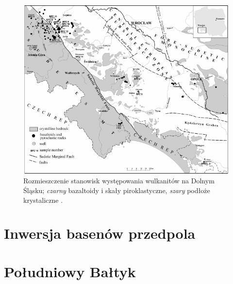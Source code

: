 \documentclass[11.5pt,twoside]{report}
\begin{document}
 \begin{figure}[h]
 	\centering
 	\includegraphics[width=0.7\linewidth]{../Termika/dslwulkanity}
 	\caption{Rozmieszczenie stanowisk występowania wulkanitów na Dolnym Śląsku; \textit{czarny} bazaltoidy i skały piroklastyczne, \textit{szary} podłoże krystaliczne \parencite{Badura.2005}.}
 	\label{Fig.}
 \end{figure}
 
 
 
 
 
 
 
  	\section{Inwersja basenów przedpola} 
  
  

  
  	\section{Południowy Bałtyk}
  	
  	
\end{document}
